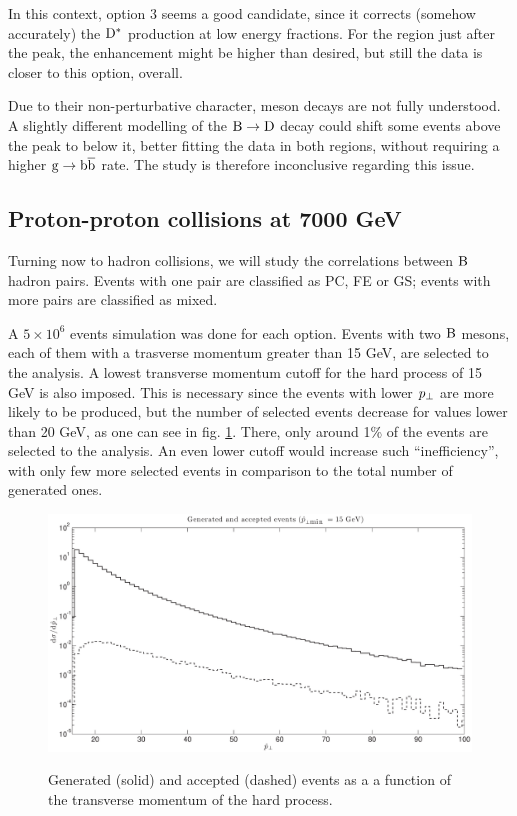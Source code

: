 \documentclass[a4paper,12pt]{article}
\begin{document}
In this context, option 3 seems a good candidate, since it corrects (somehow accurately) the ${\mathrm D}^*$ production at low energy fractions. For the region just after the peak, the enhancement might be higher than desired, but still the data is closer to this option, overall.

Due to their non-perturbative character, meson decays are not fully understood. A slightly different modelling of the ${\mathrm B}\to{\mathrm D}$ decay could shift some events above the peak to below it, better fitting the data in both regions, without requiring a higher ${\mathrm g}\to{\mathrm b}\overline{\mathrm b}$ rate. The study is therefore inconclusive regarding this issue. 

\subsection{Proton-proton collisions at 7000 GeV}

Turning now to hadron collisions, we will study the correlations between ${\mathrm B}$ hadron pairs. Events with one pair are classified as PC, FE or GS; events with more pairs are classified as mixed.

A $5\times 10^6$ events simulation was done for each option. Events with two ${\mathrm B}$ mesons, each of them with a trasverse momentum greater than 15 GeV, are selected to the analysis. A lowest transverse momentum cutoff for the hard process of 15 GeV is also imposed. This is necessary since the events with lower $p_{\perp}$ are more likely to be produced, but the number of selected events decrease for values lower than 20 GeV, as one can see in fig. \ref{fig:accepted}. There, only around 1\% of the events are selected to the analysis. An even lower cutoff would increase such ``inefficiency'', with only few more selected events in comparison to the total number of generated ones.

\begin{figure}[h]
\centering
\caption[Generated and accepted events in hadron collisions.]{Generated (solid) and accepted (dashed) events as a a function of the transverse momentum of the hard process.}
\includegraphics[width=15cm]{Accepted.eps}
\label{fig:accepted}
\end{figure}
\end{document}
